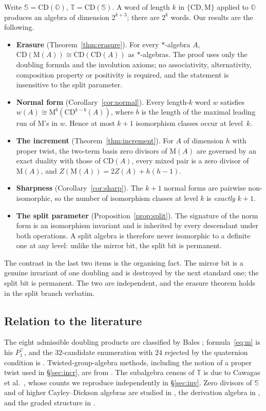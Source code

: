 \documentclass[11pt]{amsart}
\theoremstyle{plain}
\theoremstyle{definition}
\newcommand{\CD}{\mathrm{CD}}
\newcommand{\MM}{\mathrm{M}}
\newcommand{\OO}{\mathbb{O}}
\newcommand{\Sed}{\mathbb{S}}
\newcommand{\Trig}{\mathbb{T}}
\begin{document}
Write $\Sed=\CD(\OO)$, $\Trig=\CD(\Sed)$. A word of length $k$ in
$\{\CD,\MM\}$ applied to $\OO$ produces an algebra of dimension $2^{k+3}$; there
are $2^{k}$ words. Our results are the following.

\begin{itemize}
\item \textbf{Erasure} (Theorem~\ref{thm:erasure}). For every $*$-algebra $A$,
  $\CD(\MM(A))\cong\CD(\CD(A))$ as $*$-algebras. The proof uses only the
  doubling formula and the involution axioms; no associativity, alternativity,
  composition property or positivity is required, and the statement is
  insensitive to the split parameter.
\item \textbf{Normal form} (Corollary~\ref{cor:normal}). Every length-$k$ word
  $w$ satisfies $w(A)\cong\MM^{b}(\CD^{k-b}(A))$, where $b$ is the length of the
  maximal leading run of $\MM$'s in $w$. Hence at most $k+1$ isomorphism classes
  occur at level~$k$.
\item \textbf{The increment} (Theorem~\ref{thm:increment}). For $A$ of dimension
  $h$ with proper twist, the two-term basis zero divisors of $\MM(A)$ are
  governed by an exact duality with those of $\CD(A)$, every mixed pair is a
  zero divisor of $\MM(A)$, and $Z(\MM(A))=2Z(A)+h(h-1)$.
\item \textbf{Sharpness} (Corollary~\ref{cor:sharp}). The $k+1$ normal forms are
  pairwise non-isomorphic, so the number of isomorphism classes at level $k$ is
  \emph{exactly} $k+1$.
\item \textbf{The split parameter} (Proposition~\ref{prop:split}). The signature
  of the norm form is an isomorphism invariant and is inherited by every
  descendant under both operations. A split algebra is therefore never
  isomorphic to a definite one at any level: unlike the mirror bit, the split
  bit is permanent.
\end{itemize}

The contrast in the last two items is the organising fact. The mirror bit is a
genuine invariant of one doubling and is destroyed by the next standard one; the
split bit is permanent. The two are independent, and the erasure theorem holds
in the split branch verbatim.

\subsection*{Relation to the literature}
The eight admissible doubling products are classified by Bales
\cite{Bales2016,Bales2011cat}; formula~\eqref{eq:m} is his $P_1^{\top}$, and the
$32$-candidate enumeration with $24$ rejected by the quaternion condition is
\cite{Bales2011cat}. Twisted-group-algebra methods, including the notion of a
proper twist used in \S\ref{sec:incr}, are from \cite{Bales2011tw}. The
subalgebra census of $\Trig$ is due to Cawagas et al.\ \cite{Cawagas2009}, whose
counts we reproduce independently in \S\ref{sec:inv}. Zero divisors of $\Sed$ and
of higher Cayley--Dickson algebras are studied in
\cite{Moreno1998,Moreno2005,BDI2008,BCDI2009}, the derivation algebra in
\cite{Schafer1954}, and the graded structure in \cite{Wilmot2025}.
\end{document}
